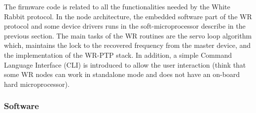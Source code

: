 The firmware code is related to all the functionalities needed by the White 
Rabbit protocol. In the node architecture, the embedded software part of the WR 
protocol and some device drivers runs in the soft-microprocessor describe in 
the previous section. The main tasks of the WR routines are the servo 
loop algorithm which, maintains the lock to the recovered frequency from the 
master device, and the implementation of the WR-PTP stack. In addition, a 
simple Command Language Interface (CLI) is introduced to allow 
the user interaction (think that some WR nodes can work in standalone mode and 
does not have an on-board hard microprocessor).

\subsubsection{Software}

